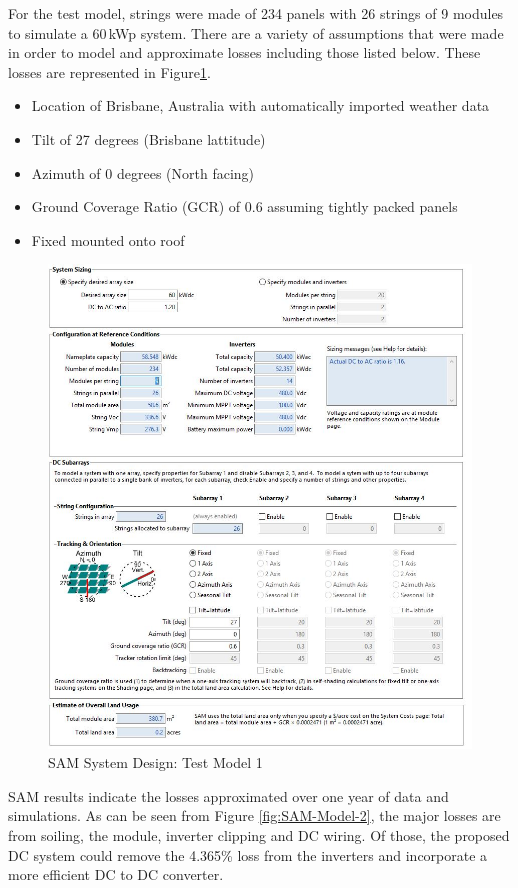 For the test model, strings were made of 234 panels with 26 strings of 9 modules to simulate a 60\,kWp system. There are a variety of assumptions that were made in order to model and approximate losses including those listed below. These losses are represented in Figure\ref{fig:SAM-Model-1}. 

\begin{itemize}[noitemsep,nolistsep]
	\item Location of Brisbane, Australia with automatically imported weather data
	\item Tilt of 27 degrees (Brisbane lattitude)
	\item Azimuth of 0 degrees (North facing)
	\item Ground Coverage Ratio (GCR) of 0.6 assuming tightly packed panels
	\item Fixed mounted onto roof 
\end{itemize}

\begin{figure}[H]
\hfill\includegraphics[width = 120mm]{images/sam-1-system-design}\hspace*{\fill}
\caption{SAM System Design: Test Model 1} 
\label{fig:SAM-Model-1}
\end{figure}      

SAM results indicate the losses approximated over one year of data and simulations. As can be seen from Figure \ref{fig:SAM-Model-2}, the major losses are from soiling, the module, inverter clipping and DC wiring. Of those, the proposed DC system could remove the 4.365\% loss from the inverters and incorporate a more efficient DC to DC converter.   

